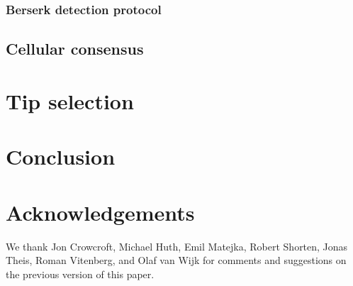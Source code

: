 \documentclass{article}
\newcommand{\1}[1]{\mathbf{1}\{#1\}}
\begin{document}
\subsubsection{Berserk detection protocol}


\subsection{Cellular consensus}

\pagebreak

\section{Tip selection}\label{sec:tsa}

\pagebreak



\section{Conclusion}\label{sec:conclusion}


\section*{Acknowledgements}
We thank 
 Jon Crowcroft, Michael Huth, Emil Matejka, Robert Shorten,
 Jonas Theis, Roman Vitenberg, and Olaf van Wijk
 for comments and suggestions on the previous 
 version of this paper.



 

\clearpage


\end{document}
